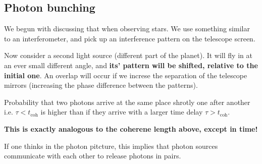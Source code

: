  \subsection{Photon bunching}
 We begun with discussing that  when observing stars.  We use something
 similar to an  interferometer, and pick up an  interference pattern on
 the telescope screen.

 Now consider a second light source  (different part of the planet). It
 will fly in at an ever small different angle, and \textbf{its' pattern
   will be shifted, relative to the initial one}. An overlap will occur
 if we increse the separation  of the telescope mirrors (increasing the
 phase  difference  between the  patterns).   

\begin{framed}\noindent
  Probability that  two photons  arrive at the  same place  shrotly one
  after another  i.e.  $ \tau  < t_{\text{coh}} $  is higher than  if they
  arrive with a larger time delay $ \tau > t_\text{coh}. $

  \textbf{\Huge This is exactly analogous to the coherene length above,
    except in time!}
\end{framed}

If one thinks in the photon  pitcture, this implies that photon sources
communicate    with    each    other     to    release    photons    in
pairs. 

